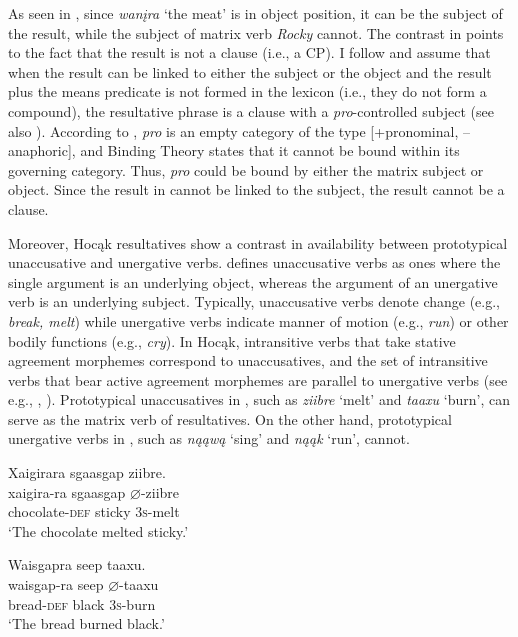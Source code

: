 \documentclass[output=paper]{LSP/langsci}
\begin{document}
As seen in , since \textit{wanįra} `the meat' is in object position, it can be the subject of the result, while the subject of matrix verb \textit{Rocky} cannot. The contrast in  points to the fact that the result is not a clause (i.e., a CP). I follow \citet{Li1999} and assume that when the result can be linked to either the subject or the object and the result plus the means predicate is not formed in the lexicon (i.e., they do not form a compound), the resultative phrase is a clause with a \textit{pro}-controlled subject (see also \citealt{Song2005}). According to \citet{Chomsky1982}, \textit{pro} is an empty category of the type [+pronominal, --anaphoric], and Binding Theory states that it cannot be bound within its governing category. Thus, \textit{pro} could be bound by either the matrix subject or object. Since the result in  cannot be linked to the subject, the result cannot be a clause.

Moreover, Hocąk resultatives show a contrast in availability between prototypical unaccusative and unergative verbs. \citet{Perlmutter1978} defines unaccusative verbs as ones where the single argument is an underlying object, whereas the argument of an unergative verb is an underlying subject. Typically, unaccusative verbs denote change (e.g., \textit{break, melt}) while unergative verbs indicate manner of motion (e.g., \textit{run}) or other bodily functions (e.g., \textit{cry}). In Hocąk, intransitive verbs that take stative agreement morphemes correspond to unaccusatives, and the set of intransitive verbs that bear active agreement morphemes are parallel to unergative verbs (see e.g., \citealt{Williamson1984}, \citealt{Woolford2010}). Prototypical unaccusatives in , such as \textit{ziibre} `melt' and \textit{taaxu} `burn', can serve as the matrix verb of resultatives. On the other hand, prototypical unergative verbs in , such as \textit{nąąwą} `sing' and \textit{nąąk} `run', cannot.

\begin{exe}
\ex\label{ex:rosen:19}
\begin{xlist}

\ex \glll Xaigirara sgaasgap {ziibre}. \\
 xaigira-ra sgaasgap {$\varnothing$}-ziibre\\
chocolate-\textsc{def} sticky \textsc{3s}-melt\\
\glt `The chocolate melted sticky.'

\ex \glll Waisgapra seep {taaxu}.\\
 waisgap-ra seep {$\varnothing$}-taaxu\\
bread-\textsc{def} black \textsc{3s}-burn\\
\glt `The bread burned black.'

\end{xlist}
\end{exe}
\end{document}
